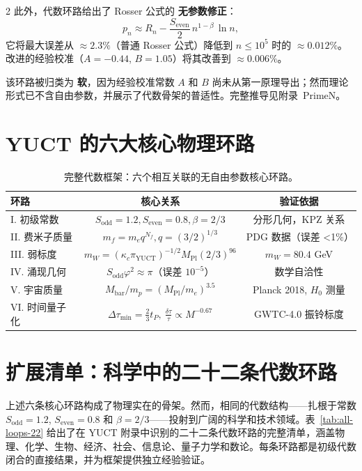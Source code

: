 \documentclass[12pt,a4paper]{article}
\begin{document}
\begin{multicols}{2}
		此外，代数环路给出了 Rosser 公式的 \textbf{无参数修正}：
		\[
		p_n \approx R_n - \frac{S_{\mathrm{even}}}{2}\, n^{1-\beta}\,\ln n,
		\]
		它将最大误差从 \(\approx 2.3\%\)（普通 Rosser 公式）降低到 \(n\le 10^5\) 时的 \(\approx 0.012\%\)。改进的经验校准（\(A = -0.44\), \(B = 1.05\)）将其改善到 \(\approx 0.006\%\)。
		
		该环路被归类为 \textbf{软}，因为经验校准常数 \(A\) 和 \(B\) 尚未从第一原理导出；然而理论形式已不含自由参数，并展示了代数骨架的普适性。完整推导见附录~PrimeN。
		
	\end{multicols}
	
	\section*{YUCT 的六大核心物理环路}
	
	\begin{table}[htbp]
		\centering
		\caption{完整代数框架：六个相互关联的无自由参数核心环路。}
		\label{tab:all-loops}
		\footnotesize
		\begin{tabular}{l c c}
			\toprule
			\textbf{环路} & \textbf{核心关系} & \textbf{验证依据} \\
			\midrule
			I. 初级常数 & \(S_{\mathrm{odd}}=1.2, S_{\mathrm{even}}=0.8, \beta=2/3\) & 分形几何，KPZ 关系 \\
			II. 费米子质量 & \(m_f = m_e q^{N_f}, q=(3/2)^{1/3}\) & PDG 数据（误差 <1\%） \\
			III. 弱标度 & \(m_W = (\kappa_c \pi_{\mathrm{YUCT}})^{-1/2} M_{\mathrm{Pl}} (2/3)^{96}\) & \(m_W = 80.4\) GeV \\
			IV. 涌现几何 & \(S_{\mathrm{odd}}\varphi^2 \approx \pi\)（误差 \(10^{-5}\)） & 数学自洽性 \\
			V. 宇宙质量 & \(M_{\mathrm{bar}}/m_p = (M_{\mathrm{Pl}}/m_e)^{3.5}\) & Planck 2018, \(H_0\) 测量 \\
			VI. 时间量子化 & \(\Delta \tau_{\min} = \frac{2}{3} t_P, \ \frac{\delta \tau}{\tau} \propto M^{-0.67}\) & GWTC-4.0 振铃标度 \\
			\bottomrule
		\end{tabular}
	\end{table}
	
	\section*{扩展清单：科学中的二十二条代数环路}
	
	上述六条核心环路构成了物理实在的骨架。然而，相同的代数结构——扎根于常数 \(S_{\mathrm{odd}} = 1.2\), \(S_{\mathrm{even}} = 0.8\) 和 \(\beta = 2/3\)——投射到广阔的科学和技术领域。表~\ref{tab:all-loops-22} 给出了在 YUCT 附录中识别的二十二条代数环路的完整清单，涵盖物理、化学、生物、经济、社会、信息论、量子力学和数论。每条环路都是初级代数闭合的直接结果，并为框架提供独立经验验证。
	
\end{document}
